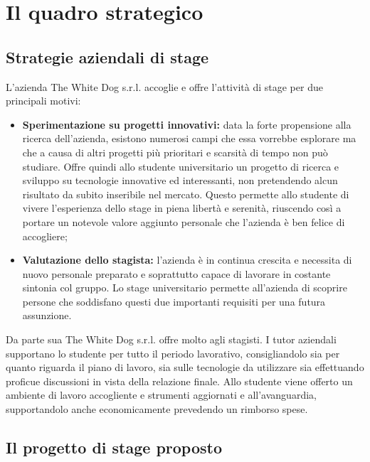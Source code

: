 \chapter{Il quadro strategico}
\label{cap:ilquadrostrategico}

\section{Strategie aziendali di stage}

L'azienda The White Dog s.r.l. accoglie e offre l'attività di stage per due principali motivi:

\begin{itemize}
	\item \textbf{Sperimentazione su progetti innovativi:} data la forte propensione alla ricerca dell'azienda, esistono numerosi campi che essa vorrebbe esplorare ma che a causa di altri progetti più prioritari e scarsità di tempo non può studiare. Offre quindi allo studente universitario un progetto di ricerca e sviluppo su tecnologie innovative ed interessanti, non pretendendo alcun risultato da subito inseribile nel mercato. Questo permette allo studente di vivere l'esperienza dello stage in piena libertà e serenità, riuscendo così a portare un notevole valore aggiunto personale che l'azienda è ben felice di accogliere;
	\item \textbf{Valutazione dello stagista:} l'azienda è in continua crescita e necessita di nuovo personale preparato e soprattutto capace di lavorare in costante sintonia col gruppo. Lo stage universitario permette all'azienda di scoprire persone che soddisfano questi due importanti requisiti per una futura assunzione.
\end{itemize}

Da parte sua The White Dog s.r.l. offre molto agli stagisti. I tutor aziendali supportano lo studente per tutto il periodo lavorativo, consigliandolo sia per quanto riguarda il piano di lavoro, sia sulle tecnologie da utilizzare sia effettuando proficue discussioni in vista della relazione finale. Allo studente viene offerto un ambiente di lavoro accogliente e strumenti aggiornati e all'avanguardia, supportandolo anche economicamente prevedendo un rimborso spese.

\section{Il progetto di stage proposto}

